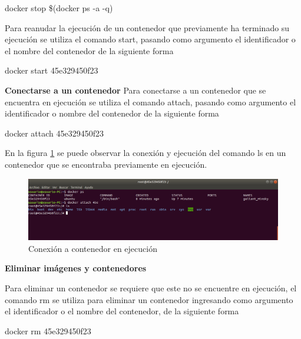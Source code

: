 \begin{commandshell} docker stop \$(docker ps -a -q) \end{commandshell}

Para reanudar la ejecución de un contenedor que previamente ha terminado su ejecución se utiliza el comando start, pasando como argumento el identificador o el nombre del contenedor de la siguiente forma 

\begin{commandshell} docker start 45e329450f23 \end{commandshell}

\textbf{Conectarse a un contenedor}
Para conectarse a un contenedor que se encuentra en ejecución se utiliza el comando attach, pasando como argumento el identificador o nombre del contenedor de la siguiente forma

\begin{commandshell} docker attach 45e329450f23 \end{commandshell}

En la figura \ref{fig:DockerGestion10} se puede observar la conexión y ejecución del comando ls en un contenedor que se encontraba previamente en ejecución.

\begin{figure}[!hbtp]
	\centering
	\includegraphics[width=\linewidth]{RE05_Docker/Gestion_basica/REDocker_Gestion10.png}
	\vspace{-0.2cm}
	\caption{Conexión a contenedor en ejecución}
	\label{fig:DockerGestion10}
\end{figure}

\textbf{Eliminar imágenes y contenedores}

Para eliminar un contenedor se requiere que este no se encuentre en ejecución, el comando rm se utiliza para eliminar un contenedor ingresando como argumento el identificador o el nombre del contenedor, de la siguiente forma
\begin{commandshell} docker rm 45e329450f23 \end{commandshell}

